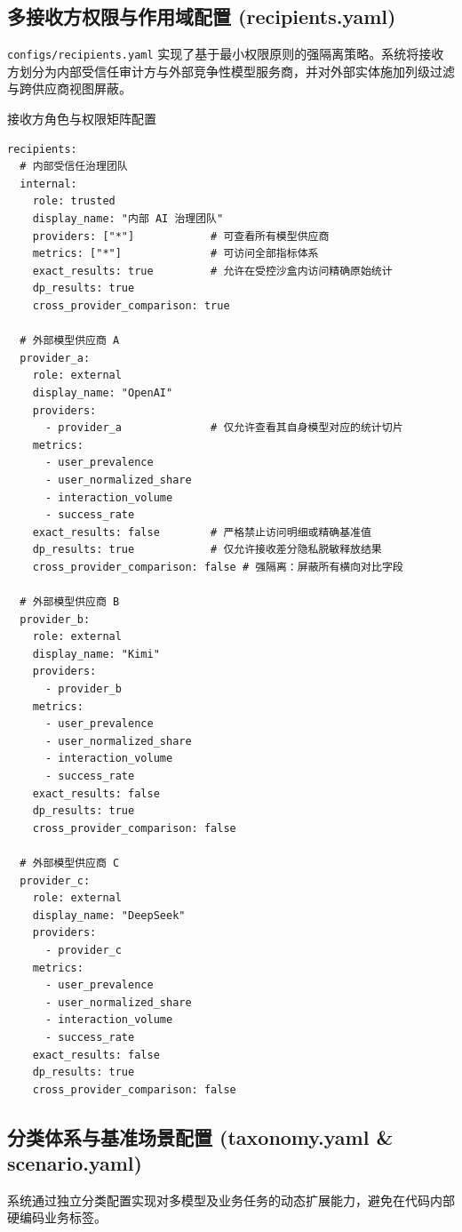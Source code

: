 \subsection{多接收方权限与作用域配置 (recipients.yaml)}

\texttt{configs/recipients.yaml} 实现了基于最小权限原则的强隔离策略。系统将接收方划分为内部受信任审计方与外部竞争性模型服务商，并对外部实体施加列级过滤与跨供应商视图屏蔽。

\begin{techbox}{接收方角色与权限矩阵配置}
\begin{verbatim}
recipients:
  # 内部受信任治理团队
  internal:
    role: trusted
    display_name: "内部 AI 治理团队"
    providers: ["*"]            # 可查看所有模型供应商
    metrics: ["*"]              # 可访问全部指标体系
    exact_results: true         # 允许在受控沙盒内访问精确原始统计
    dp_results: true
    cross_provider_comparison: true

  # 外部模型供应商 A
  provider_a:
    role: external
    display_name: "OpenAI"
    providers:
      - provider_a              # 仅允许查看其自身模型对应的统计切片
    metrics:
      - user_prevalence
      - user_normalized_share
      - interaction_volume
      - success_rate
    exact_results: false        # 严格禁止访问明细或精确基准值
    dp_results: true            # 仅允许接收差分隐私脱敏释放结果
    cross_provider_comparison: false # 强隔离：屏蔽所有横向对比字段

  # 外部模型供应商 B
  provider_b:
    role: external
    display_name: "Kimi"
    providers:
      - provider_b
    metrics:
      - user_prevalence
      - user_normalized_share
      - interaction_volume
      - success_rate
    exact_results: false
    dp_results: true
    cross_provider_comparison: false

  # 外部模型供应商 C
  provider_c:
    role: external
    display_name: "DeepSeek"
    providers:
      - provider_c
    metrics:
      - user_prevalence
      - user_normalized_share
      - interaction_volume
      - success_rate
    exact_results: false
    dp_results: true
    cross_provider_comparison: false
\end{verbatim}
\end{techbox}

\subsection{分类体系与基准场景配置 (taxonomy.yaml \& scenario.yaml)}

系统通过独立分类配置实现对多模型及业务任务的动态扩展能力，避免在代码内部硬编码业务标签。

